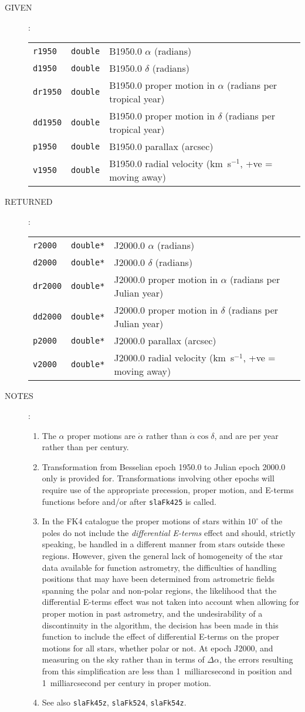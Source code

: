 \documentclass[11pt,fleqn,twoside]{article}
\renewcommand{\_}{{\tt\char'137}}     %
\newlength{\oldspacing}
\newcommand{\args}[2]
{
  \goodbreak
  \setlength{\oldspacing}{\topsep}
  \setlength{\topsep}{0.3ex}
  \begin{description}
  \item[#1]:\\[1.5ex]
    \begin{tabular}{p{6.7em}p{6.8em}p{22em}}
      #2
    \end{tabular}
  \end{description}
  \setlength{\topsep}{\oldspacing}
}
\newcommand{\spec}[3]
{
  {\tt \mbox{#1}} & {\tt \mbox{#2}} & {#3}
}
\newcommand{\notes}[1]
{
  \goodbreak
  \setlength{\oldspacing}{\topsep}
  \setlength{\topsep}{0.3ex}
  \begin{description}
    \item[NOTES]:
        #1
  \end{description}
  \setlength{\topsep}{\oldspacing}
}
\begin{document}
\args{GIVEN}
{
 \spec{r1950}{double}{B1950.0 $\alpha$ (radians)} \\
 \spec{d1950}{double}{B1950.0 $\delta$ (radians)} \\
 \spec{dr1950}{double}{B1950.0 proper motion in $\alpha$
                              (radians per tropical year)} \\
 \spec{dd1950}{double}{B1950.0 proper motion in $\delta$
                              (radians per tropical year)} \\
 \spec{p1950}{double}{B1950.0 parallax (arcsec)} \\
 \spec{v1950}{double}{B1950.0 radial velocity (km~s$^{-1}$, +ve = moving away)}
}
\args{RETURNED}
{
 \spec{r2000}{double*}{J2000.0 $\alpha$ (radians)} \\
 \spec{d2000}{double*}{J2000.0 $\delta$ (radians)} \\
 \spec{dr2000}{double*}{J2000.0 proper motion in $\alpha$
                              (radians per Julian year)} \\
 \spec{dd2000}{double*}{J2000.0 proper motion in $\delta$
                              (radians per Julian year)} \\
 \spec{p2000}{double*}{J2000.0 parallax (arcsec)} \\
 \spec{v2000}{double*}{J2000.0 radial velocity (km~s$^{-1}$, +ve = moving away)}
}
\notes
{
 \begin{enumerate}
  \item The $\alpha$ proper motions are $\dot{\alpha}$ rather than
        $\dot{\alpha}\cos\delta$, and are per year rather than per century.
  \item Transformation from Besselian epoch 1950.0 to Julian epoch
        2000.0 only is provided for.  Transformations involving other
        epochs will require use of the appropriate precession,
        proper motion, and E-terms functions before and/or after {\tt slaFk425}
        is called.
  \item In the FK4 catalogue the proper motions of stars within
        $10^{\circ}$ of the poles do not include the {\it differential
        E-terms}\/ effect and should, strictly speaking, be handled
        in a different manner from stars outside these regions.
        However, given the general lack of homogeneity of the star
        data available for function astrometry, the difficulties of
        handling positions that may have been determined from
        astrometric fields spanning the polar and non-polar regions,
        the likelihood that the differential E-terms effect was not
        taken into account when allowing for proper motion in past
        astrometry, and the undesirability of a discontinuity in
        the algorithm, the decision has been made in this function to
        include the effect of differential E-terms on the proper
        motions for all stars, whether polar or not.  At epoch J2000,
        and measuring on the sky rather than in terms of $\Delta\alpha$,
        the errors resulting from this simplification are less than
        1~milliarcsecond in position and 1~milliarcsecond per
        century in proper motion.
  \item See also {\tt slaFk45z}, {\tt slaFk524}, {\tt slaFk54z}.
 \end{enumerate}
}
\end{document}
